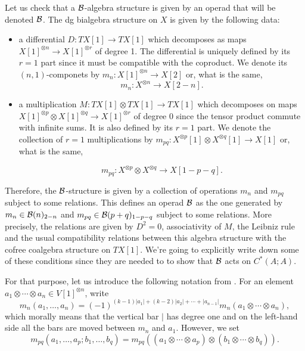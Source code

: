 \documentclass[TFM.tex]{subfiles}
\begin{document}
Let us check that a $\mathcal{B}$-algebra structure is given by an operad that will be denoted $\mathcal{B}$. 
The dg bialgebra structure on $X$ is given by the following data:
\begin{itemize}
\item a differential $D:TX[1]\to TX[1]$ which decomposes as maps $X[1]^{\otimes n}\to X[1]^{\otimes r}$ of degree 1. The differential is uniquely defined by its $r=1$ part since it must be compatible with the coproduct. We denote its $(n,1)$-componets by $m_n:X[1]^{\otimes n}\to X[2]$ or, what is the same, 
\begin{equation}\label{mn}
m_n:X^{\otimes n}\to X[2-n].
\end{equation}

\item a multiplication $M:TX[1]\otimes TX[1]\to TX[1]$ which decomposes on maps $X[1]^{\otimes p}\otimes X[1]^{\otimes q}\to X[1]^{\otimes r}$ of degree 0 since the tensor product commute with infinite sums. It is also defined by its $r=1$ part. We denote the collection of $r=1$ multiplications by $m_{pq}:X^{\otimes p}[1]\otimes X^{\otimes q}[1]\to X[1]$ or, what is the same, 

\begin{equation}\label{mpq}
m_{pq}:X^{\otimes p}\otimes X^{\otimes q}\to X[1-p-q].
\end{equation}
\end{itemize}
Therefore, the $\mathcal{B}$-structure is given by a collection of operations $m_n$ and $m_{pq}$
subject to some relations. This defines an operad $\mathcal{B}$ as the one generated by $m_n\in\mathcal{B}(n)_{2-n}$ and $m_{pq}\in\mathcal{B}(p+q)_{1-p-q}$ subject to some relations. More precisely, the relations are given by $D^2=0$, associativity of $M$, the Leibniz rule and the usual compatibility relations between this algebra structure with the cofree coalgebra structure on $TX[1]$. We're going to explicitly write down some of these conditions since they are needed to to show that $\mathcal{B}$ acts on $C^*(A;A)$.  %

For that purpose, let us introduce the following notation from \cite{VO}. For an element $a_1\otimes\cdots\otimes a_n\in V[1]^{\otimes n}$, write
\[
m_n(a_1,\dots,a_n)=(-1)^{(k-1)|a_1|+(k-2)|a_2|+\cdots+|a_{n-1}|}m_n(a_1\otimes\cdots\otimes a_n),
\]
which morally means that the vertical bar $|$ has degree one and on the left-hand
side all the bars are moved between $m_n$ and $a_1$. However, we set
\[
m_{pq}(a_1,\dots, a_p;b_1,\dots, b_q)=m_{pq}((a_1\otimes\cdots\otimes a_p)\otimes(b_1\otimes\cdots\otimes b_q)).
\]
\end{document}
